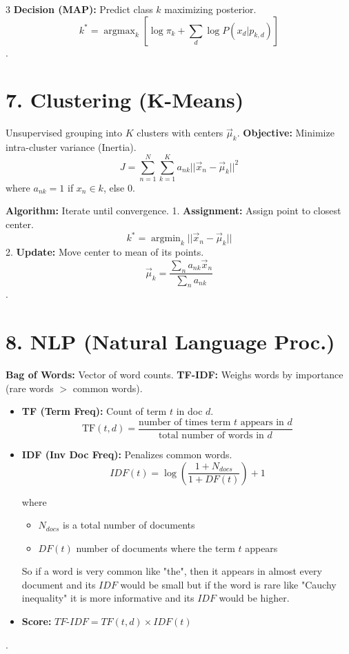 \documentclass[10pt, a4paper, landscape]{article}
\begin{document}
\begin{multicols*}{3}
\textbf{Decision (MAP):} Predict class $k$ maximizing posterior.
$$ k^* = \operatorname{argmax}_k [ \log \pi_k + \sum_d \log P(x_d | p_{k,d}) ] $$
.

\section{7. Clustering (K-Means)}
Unsupervised grouping into $K$ clusters with centers $\vec{\mu}_k$.
\textbf{Objective:} Minimize intra-cluster variance (Inertia).
$$ J = \sum_{n=1}^N \sum_{k=1}^K a_{nk} ||\vec{x}_n - \vec{\mu}_k||^2 $$
where $a_{nk}=1$ if $x_n \in k$, else $0$.

\textbf{Algorithm:} Iterate until convergence.
1. \textbf{Assignment:} Assign point to closest center.
   $$ k^* = \operatorname{argmin}_k ||\vec{x}_n - \vec{\mu}_k|| $$
2. \textbf{Update:} Move center to mean of its points.
   $$ \vec{\mu}_k = \frac{\sum_n a_{nk} \vec{x}_n}{\sum_n a_{nk}} $$
.

\section{8. NLP (Natural Language Proc.)}
\textbf{Bag of Words:} Vector of word counts.
\textbf{TF-IDF:} Weighs words by importance (rare words $>$ common words).
\begin{itemize}
    \item \textbf{TF (Term Freq):} Count of term $t$ in doc $d$.
\[
\text{TF}(t,d) = \frac{\text{number of times term } t \text{ appears in } d}{\text{total number of words in } d}
\]
    \item \textbf{IDF (Inv Doc Freq):} Penalizes common words.
    $$ IDF(t) = \log\left(\frac{1+N_{docs}}{1+DF(t)}\right) + 1 $$

    where 
    \begin{itemize}
        \item $N_{docs}$ is a total number of documents
        \item  $DF(t)$ number of documents where the term  $t$ appears
    \end{itemize}
    So if a word is very common like "the", then it appears in almost every
    document and its $IDF$ would be small but if the word is rare like "Cauchy
    inequality" it is more informative and its  $IDF$ would be higher.
    \item \textbf{Score:} $TF\text{-}IDF = TF(t,d) \times IDF(t)$
\end{itemize}
.


\end{multicols*}
\end{document}
